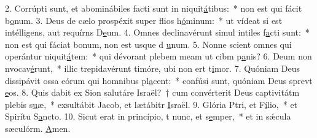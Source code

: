 2. Corrúpti sunt, et abominábiles facti sunt in niquit\uline{á}tibus:~* non est qui fácit b\uline{o}num.
3. Deus de cælo prospéxit super flios h\uline{ó}minum:~* ut vídeat si est intélligens, aut requírns D\uline{e}um.
4. Omnes declinavérunt simul intiles f\uline{a}cti sunt:~* non est qui fáciat bonum, non est usque d \uline{u}num.
5. Nonne scient omnes qui operántur niquit\uline{á}tem:~* qui dévorant plebem meam ut cibm p\uline{a}nis?
6. Deum non nvocav\uline{é}runt,~* illic trepidavérunt timóre, ubi non ert t\uline{i}mor.
7. Quóniam Deus dissipávit ossa eórum qui homnibus pl\uline{a}cent:~* confúsi sunt, quóniam Deus sprevt \uline{e}os.
8. Quis dabit ex Sion salutáre Israël?~† cum convérterit Deus captivitátm plebis s\uline{u}æ,~* exsultábit Jacob, et lætábitr \uline{I}sraël.
9. Glória Ptri, et F\uline{í}lio,~* et Spirítu S\uline{a}ncto.
10. Sicut erat in princípio, t nunc, et s\uline{e}mper,~* et in sǽcula sæculórm. \uline{A}men.
